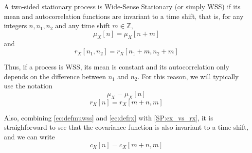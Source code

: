 \begin{definition}
A two-sided stationary process is Wide-Sense Stationary (or simply WSS) if its mean and autocorrelation functions are invariant to a time shift, that is, for any integers $n, n_1, n_2$ and any time shift $m \in \mathbb{Z}$,
\begin{equation}
\mu_X[n] = \mu_X[n+m]
\end{equation}
and
\begin{equation}
r_X[n_1,n_2] = r_X[n_1 + m, n_2 + m]
\end{equation}
\end{definition}

Thus, if a process is WSS, its mean is constant and its autocorrelation only depends on the difference between $n_1$ and $n_2$. For this reason, we will typically use the notation
\begin{equation}\label{ec:defmuwss}
\mu_X = \mu_X[n]
\end{equation}
\begin{equation}\label{ec:defrx}
r_X[n] = r_X[m + n, m]
\end{equation}

Also, combining \eqref{ec:defmuwss} and \eqref{ec:defrx} with \eqref{SP:cx_vs_rx}, it is straighforward to see that the covariance function is also invariant to a time shift, and we can write
\begin{equation}\label{ec:defcx}
c_X[n] = c_X[m + n, m]
\end{equation}


